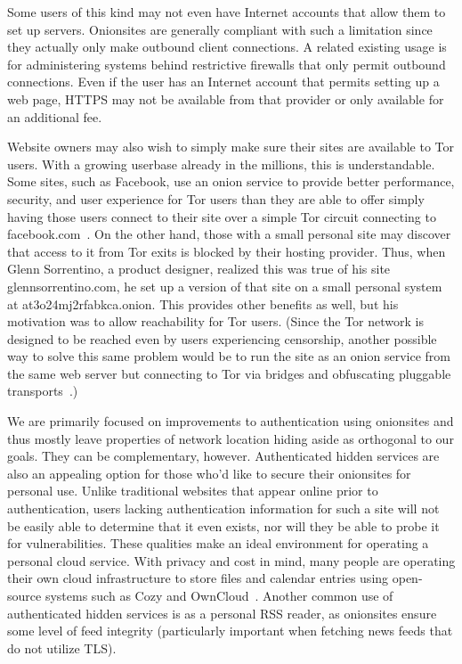 \documentclass[10pt]{styles/IEEEtran}
\begin{document}
Some users of this kind may not even have Internet accounts that allow
them to set up servers. Onionsites are generally compliant with such a
limitation since they actually only make outbound client
connections. A related existing usage is for
administering systems behind restrictive firewalls that only permit
outbound connections.  Even if the user has an Internet account that
permits setting up a web page, HTTPS may not be available from that
provider or only available for an additional fee.

Website owners may also wish to simply make sure their sites are
available to Tor users. With a growing userbase already in the
millions, this is understandable.  Some sites, such as Facebook, use an
onion service to provide better performance, security, and user
experience for Tor users than they are able to offer simply having
those users connect to their site over a simple Tor circuit connecting
to facebook.com~\cite{7686-and-all}. On the other hand, those with a
small personal site may discover that access to it from Tor exits is
blocked by their hosting provider.  Thus, when Glenn Sorrentino, a
product designer, realized this was true of his site glennsorrentino.com,
he set up a version of that site on a small personal system at
at3o24mj2rfabkca.onion. This provides other benefits as well, but his
motivation was to allow reachability for Tor users. (Since the Tor network
is designed to be reached even by users experiencing censorship,
another possible way to solve this same problem would be to run the
site as an onion service from the same web server but
connecting to Tor via bridges and obfuscating pluggable
transports~\cite{bridges}.)

We are primarily focused on improvements to authentication using
onionsites and thus mostly leave properties of network location hiding
aside as orthogonal to our goals. They can be complementary, however.
Authenticated
hidden services are also an appealing option for those who'd like to
secure their onionsites for personal use.  Unlike traditional websites
that appear online prior to authentication, users lacking
authentication information for such a site will not be easily able to
determine that it even exists, nor will they be able to probe it for
vulnerabilities.  These qualities make an ideal environment for
operating a personal cloud service.  With privacy and cost in mind,
many people are operating their own cloud infrastructure to store
files and calendar entries using open-source systems such as Cozy and
OwnCloud~\cite{cozy}.  Another common use of authenticated hidden
services is as a personal RSS reader, as onionsites ensure some level
of feed integrity (particularly important when fetching news feeds
that do not utilize TLS).
\end{document}
